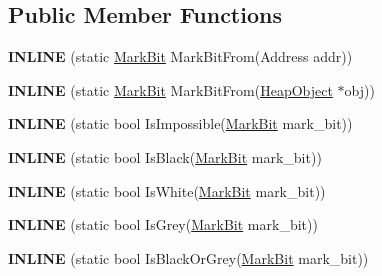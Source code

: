 \subsection*{Public Member Functions}
\begin{DoxyCompactItemize}
\item 
{\bfseries I\+N\+L\+I\+NE} (static \hyperlink{classv8_1_1internal_1_1_mark_bit}{Mark\+Bit} Mark\+Bit\+From(Address addr))\hypertarget{classv8_1_1internal_1_1_marking_a9d622afe36309d89ca25dc782a0af1e7}{}\label{classv8_1_1internal_1_1_marking_a9d622afe36309d89ca25dc782a0af1e7}

\item 
{\bfseries I\+N\+L\+I\+NE} (static \hyperlink{classv8_1_1internal_1_1_mark_bit}{Mark\+Bit} Mark\+Bit\+From(\hyperlink{classv8_1_1internal_1_1_heap_object}{Heap\+Object} $\ast$obj))\hypertarget{classv8_1_1internal_1_1_marking_a33efa5e43c1b88f07d5a22e343df73c9}{}\label{classv8_1_1internal_1_1_marking_a33efa5e43c1b88f07d5a22e343df73c9}

\item 
{\bfseries I\+N\+L\+I\+NE} (static bool Is\+Impossible(\hyperlink{classv8_1_1internal_1_1_mark_bit}{Mark\+Bit} mark\+\_\+bit))\hypertarget{classv8_1_1internal_1_1_marking_a03b01c11106f26472e6c9c3d7bae7d1d}{}\label{classv8_1_1internal_1_1_marking_a03b01c11106f26472e6c9c3d7bae7d1d}

\item 
{\bfseries I\+N\+L\+I\+NE} (static bool Is\+Black(\hyperlink{classv8_1_1internal_1_1_mark_bit}{Mark\+Bit} mark\+\_\+bit))\hypertarget{classv8_1_1internal_1_1_marking_aa0f36340f8d772f7cd645607bdb7312f}{}\label{classv8_1_1internal_1_1_marking_aa0f36340f8d772f7cd645607bdb7312f}

\item 
{\bfseries I\+N\+L\+I\+NE} (static bool Is\+White(\hyperlink{classv8_1_1internal_1_1_mark_bit}{Mark\+Bit} mark\+\_\+bit))\hypertarget{classv8_1_1internal_1_1_marking_afd3bfc3f01a2e0b2516bc43837e2d811}{}\label{classv8_1_1internal_1_1_marking_afd3bfc3f01a2e0b2516bc43837e2d811}

\item 
{\bfseries I\+N\+L\+I\+NE} (static bool Is\+Grey(\hyperlink{classv8_1_1internal_1_1_mark_bit}{Mark\+Bit} mark\+\_\+bit))\hypertarget{classv8_1_1internal_1_1_marking_af7b4ca72c5774f217c36c4e1e7f3dda7}{}\label{classv8_1_1internal_1_1_marking_af7b4ca72c5774f217c36c4e1e7f3dda7}

\item 
{\bfseries I\+N\+L\+I\+NE} (static bool Is\+Black\+Or\+Grey(\hyperlink{classv8_1_1internal_1_1_mark_bit}{Mark\+Bit} mark\+\_\+bit))\hypertarget{classv8_1_1internal_1_1_marking_afe8490e7e95e69190ed6ff6816bc7250}{}\label{classv8_1_1internal_1_1_marking_afe8490e7e95e69190ed6ff6816bc7250}


\end{DoxyCompactItemize}
